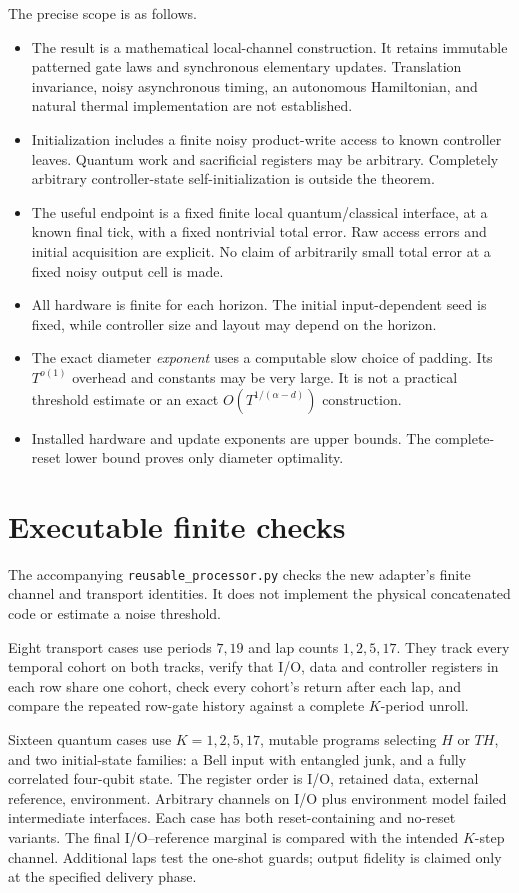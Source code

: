 \documentclass[11pt]{article}
\begin{document}
The precise scope is as follows.
\begin{itemize}
\item The result is a mathematical local-channel construction. It retains
immutable patterned gate laws and synchronous elementary updates.
Translation invariance, noisy asynchronous timing, an autonomous
Hamiltonian, and natural thermal implementation are not established.
\item Initialization includes a finite noisy product-write access to
known controller leaves. Quantum work and sacrificial registers may be
arbitrary. Completely arbitrary controller-state self-initialization is
outside the theorem.
\item The useful endpoint is a fixed finite local quantum/classical
interface, at a known final tick, with a fixed nontrivial total error.
Raw access errors and initial acquisition are explicit. No claim of
arbitrarily small total error at a fixed noisy output cell is made.
\item All hardware is finite for each horizon. The initial
input-dependent seed is fixed, while controller size and layout may
depend on the horizon.
\item The exact diameter \emph{exponent} uses a computable slow choice of
padding. Its $T^{o(1)}$ overhead and constants may be very large.
It is not a practical threshold estimate or an exact
$O(T^{1/(\alpha-d)})$ construction.
\item Installed hardware and update exponents are upper bounds. The
complete-reset lower bound proves only diameter optimality.
\end{itemize}

\section{Executable finite checks}

The accompanying \texttt{reusable\_processor.py} checks the new adapter's
finite channel and transport identities. It does not implement the
physical concatenated code or estimate a noise threshold.

Eight transport cases use periods $7,19$ and lap counts $1,2,5,17$.
They track every temporal cohort on both tracks, verify that I/O,
data and controller registers in each row share one cohort, check every
cohort's return after each lap, and compare the repeated row-gate history
against a complete $K$-period unroll.

Sixteen quantum cases use $K=1,2,5,17$, mutable programs selecting $H$
or $TH$, and two initial-state families: a Bell input with entangled
junk, and a fully correlated four-qubit state. The register order is
I/O, retained data, external reference, environment. Arbitrary channels
on I/O plus environment model failed intermediate interfaces. Each
case has both reset-containing and no-reset variants. The final
I/O--reference marginal is compared with the intended $K$-step channel.
Additional laps test the one-shot guards; output fidelity is claimed
only at the specified delivery phase.
\end{document}
